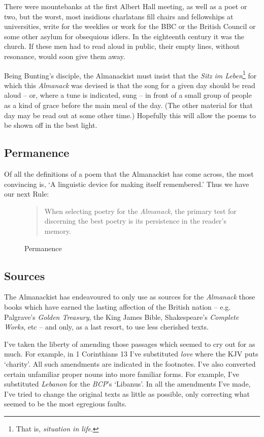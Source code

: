 \documentclass[0main.tex]{subfiles}
\begin{document}
{\footnotesize There were mountebanks at the first Albert Hall meeting, as well as a poet or two, but the worst, most insidious charlatans fill chairs and fellowships at universities, write for the weeklies or work for the BBC or the British Council or some other asylum for obsequious idlers. In the eighteenth century it was the church. If these men had to read aloud in public, their empty lines, without resonance, would soon give them away.}
\bigskip

Being Bunting's disciple, the Almanackist must insist that the \emph{Sitz im Leben}\footnote{That is, \emph{situation in life}.} for which this \emph{Almanack} was devised is that the song for a given day should be read aloud -- or, where a tune is indicated, sung -- in front of a small group of people as a kind of grace before the main meal of the day. (The other material for that day may be read out at some other time.) Hopefully this will allow the poems to be shown off in the best light.

\subsection{Permanence}

Of all the definitions of a poem that the Almanackist has come across, the most convincing is, `A linguistic device for making itself remembered.' Thus we have our next Rule:

\begin{figure}[h]
\caption{Permanence}
\begin{quote}
When selecting poetry for the \emph{Almanack}, the primary test for discerning the best poetry is its persistence in the reader's memory.
\end{quote}
\end{figure}

\subsection{Sources}

The Almanackist has endeavoured to only use as sources for the \emph{Almanack} those books which have earned the lasting affection of the British nation -- e.g. Palgrave's \emph{Golden Treasury}, the King James Bible, Shakespeare's \emph{Complete Works}, etc -- and only, as a last resort, to use less cherished texts.

I've taken the liberty of amending those passages which seemed to cry out for as much. For example, in 1 Corinthians 13 I've substituted \emph{love} where the KJV puts `charity'. All such amendments are indicated in the footnotes. I've also converted certain unfamiliar proper nouns into more familiar forms. For example, I've substituted \emph{Lebanon} for the \emph{BCP}'s `Libanus'. In all the amendments I've made, I've tried to change the original texts as little as possible, only correcting what seemed to be the most egregious faults.
\end{document}
